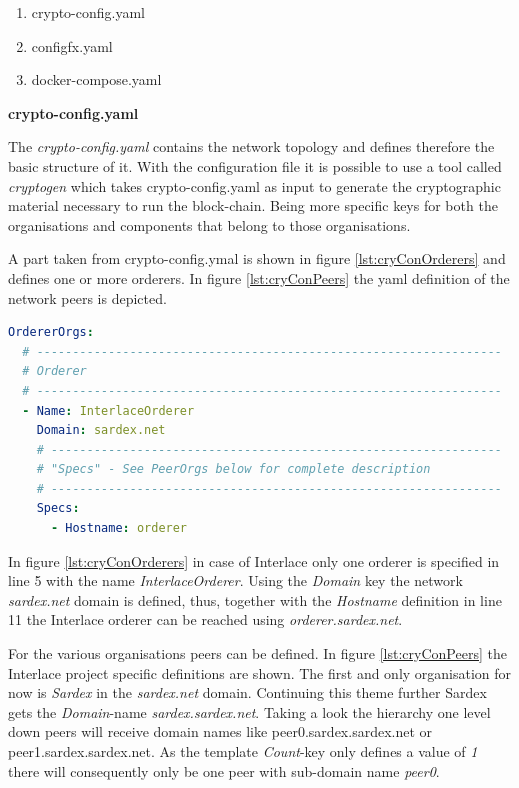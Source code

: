 \begin{enumerate}
	\item crypto-config.yaml
	\item configfx.yaml
	\item docker-compose.yaml
\end{enumerate}

\textbf{crypto-config.yaml}

The \textit{crypto-config.yaml} contains the network topology and defines therefore the basic structure of it. With the configuration file it is possible to use a tool called \textit{cryptogen} which takes crypto-config.yaml as input to generate the cryptographic material necessary to run the block-chain. Being more specific keys for both the organisations and components that belong to those organisations.

A part taken from crypto-config.ymal is shown in figure \ref{lst:cryConOrderers} and defines one or more orderers. In figure \ref{lst:cryConPeers} the yaml definition of the network peers is depicted.

\begin{center}
\begin{minipage}{0.8\textwidth}
\small
\begin{lstlisting}[language=yaml,firstnumber=1,caption={\bf\small crypto-config.yaml excerpt - Orderer(s) definition},captionpos=b,label=lst:cryConOrderers]
OrdererOrgs:
  # -----------------------------------------------------------------
  # Orderer
  # -----------------------------------------------------------------
  - Name: InterlaceOrderer
    Domain: sardex.net
    # ---------------------------------------------------------------
    # "Specs" - See PeerOrgs below for complete description
    # ---------------------------------------------------------------
    Specs:
  	  - Hostname: orderer
\end{lstlisting}
\end{minipage}
\end{center}

In figure \ref{lst:cryConOrderers} in case of Interlace only one orderer is specified in line 5 with the name \textit{InterlaceOrderer}. Using the \textit{Domain} key the network \textit{sardex.net} domain is defined, thus, together with the \textit{Hostname} definition in line 11 the Interlace orderer can be reached using \textit{orderer.sardex.net}.

For the various organisations peers can be defined. In figure \ref{lst:cryConPeers} the Interlace project specific definitions are shown. The first and only organisation for now is \textit{Sardex} in the \textit{sardex.net} domain. Continuing this theme further Sardex gets the \textit{Domain}-name \textit{sardex.sardex.net}. Taking a look the hierarchy one level down peers will receive domain names like peer0.sardex.sardex.net or peer1.sardex.sardex.net. As the template \textit{Count}-key only defines a value of \textit{1} there will consequently only be one peer with sub-domain name \textit{peer0}.

